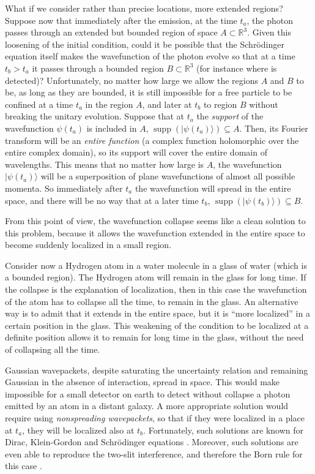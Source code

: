 \documentclass[12pt]{amsart}
\theoremstyle{definition}
\theoremstyle{plain}
\begin{document}
What if we consider rather than precise locations, more extended regions? Suppose now that immediately after the emission, at the time $t_a$, the photon passes through an extended but bounded region of space $A\subset\mathbb{R}^3$. Given this loosening of the initial condition, could it be possible that the Schr\"odinger equation itself makes the wavefunction of the photon evolve so that at a time $t_b>t_a$ it passes through a bounded region $B\subset\mathbb{R}^3$ (for instance where is detected)? Unfortunately, no matter how large we allow the regions $A$ and $B$ to be, as long as they are bounded, it is still impossible for a free particle to be confined at a time $t_a$ in the region $A$, and later at $t_b$ to region $B$ without breaking the unitary evolution. Suppose that at $t_a$ the \emph{support} of the wavefunction $\psi(t_a)$ is included in $A$, $\operatorname{supp}(|{\psi(t_a)}\rangle)\subseteq A$. Then, its Fourier transform will be an \emph{entire function} (a complex function holomorphic over the entire complex domain), so its support will cover the entire domain of wavelengths. This means that no matter how large is $A$, the wavefunction $|{\psi(t_a)}\rangle$ will be a superposition of plane wavefunctions of almost all possible momenta. So immediately after $t_a$ the wavefunction will spread in the entire space, and there will be no way that at a later time $t_b$, $\operatorname{supp}(|{\psi(t_b)}\rangle)\subseteq B$.

From this point of view, the wavefunction collapse seems like a clean solution to this problem, because it allows the wavefunction extended in the entire space to become suddenly localized in a small region.

Consider now a Hydrogen atom in a water molecule in a glass of water (which is a bounded region). The Hydrogen atom will remain in the glass for long time. If the collapse is the explanation of localization, then in this case the wavefunction of the atom has to collapse all the time, to remain in the glass. An alternative way is to admit that it extends in the entire space, but it is ``more localized'' in a certain position in the glass. This weakening of the condition to be localized at a definite position allows it to remain for long time in the glass, without the need of collapsing all the time.

Gaussian wavepackets, despite saturating the uncertainty relation and remaining Gaussian in the absence of interaction, spread in space. This would make impossible for a small detector on earth to detect without collapse a photon emitted by an atom in a distant galaxy.
A more appropriate solution would require using \emph{nonspreading wavepackets}, so that if they were localized in a place at $t_a$, they will be localized also at $t_b$.
Fortunately, such solutions are known for Dirac, Klein-Gordon and Schr\"odinger equations \cite{courant1966methods,ziolkowski1989space,shaarawi1990novel,Barut1990EequalHW,barut1990quantumParticleLike,hillion1992nondispersive,sheppard2002generalized,zamboni2012soliton}. Moreover, such solutions are even able to reproduce the two-slit interference, and therefore the Born rule for this case \cite{shaarawi1994diffraction}.
\end{document}
